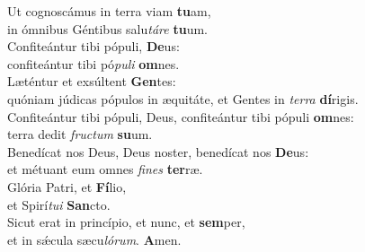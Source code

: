 \evenverse Ut cognoscámus in terra viam \textbf{tu}am,~\*\\
\evenverse in ómnibus Géntibus salu\textit{tá}\textit{re} \textbf{tu}um.\\
\oddverse Confiteántur tibi pópuli, \textbf{De}us:~\*\\
\oddverse confiteántur tibi pó\textit{pu}\textit{li} \textbf{om}nes.\\
\evenverse Læténtur et exsúltent \textbf{Gen}tes:~\*\\
\evenverse quóniam júdicas pópulos in æquitáte, et Gentes in \textit{ter}\textit{ra} \textbf{dí}rigis.\\
\oddverse Confiteántur tibi pópuli, Deus, confiteántur tibi pópuli \textbf{om}nes:~\*\\
\oddverse terra dedit \textit{fru}\textit{ctum} \textbf{su}um.\\
\evenverse Benedícat nos Deus, Deus noster, benedícat nos \textbf{De}us:~\*\\
\evenverse et métuant eum omnes \textit{fi}\textit{nes} \textbf{ter}ræ.\\
\oddverse Glória Patri, et \textbf{Fí}lio,~\*\\
\oddverse et Spirí\textit{tu}\textit{i} \textbf{San}cto.\\
\evenverse Sicut erat in princípio, et nunc, et \textbf{sem}per,~\*\\
\evenverse et in sǽcula sæcu\textit{ló}\textit{rum}. \textbf{A}men.\\
